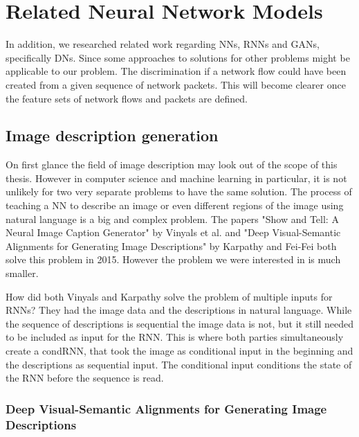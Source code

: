 \documentclass[
	ngerman,
	ruledheaders=section,%
	class=report,%
	thesis={type=bachelor},%
	accentcolor=9c,%
	custommargins=true,%
	marginpar=false,%
	parskip=half-,%
	fontsize=11pt,%
]{tudapub}
\begin{document}
\section{Related Neural Network Models}

In addition, we researched related work regarding NNs, RNNs and GANs, specifically DNs.
Since some approaches to solutions for other problems might be applicable to our problem.
The discrimination if a network flow could have been created from a given sequence of network packets.
This will become clearer once the feature sets of network flows and packets are defined.



\subsection{Image description generation}

On first glance the field of image description may look out of the scope of this thesis.
However in computer science and machine learning in particular, it is not unlikely for two very separate problems to have the same solution.
The process of teaching a NN to describe an image or even different regions of the image using natural language is a big and complex problem.
The papers "Show and Tell: A Neural Image Caption Generator" by Vinyals et al. \cite{vinyalsShowTellNeural2015} and "Deep Visual-Semantic Alignments for Generating Image Descriptions" by Karpathy and Fei-Fei \cite{karpathyDeepVisualSemanticAlignments2015} both solve this problem in 2015.
However the problem we were interested in is much smaller.

How did both Vinyals and Karpathy solve the problem of multiple inputs for RNNs?
They had the image data and the descriptions in natural language.
While the sequence of descriptions is sequential the image data is not, but it still needed to be included as input for the RNN.
This is where both parties simultaneously create a condRNN, that took the image as conditional input in the beginning and the descriptions as sequential input.
The conditional input conditions the state of the RNN before the sequence is read.

\subsubsection{Deep Visual-Semantic Alignments for Generating Image Descriptions} %
\end{document}
